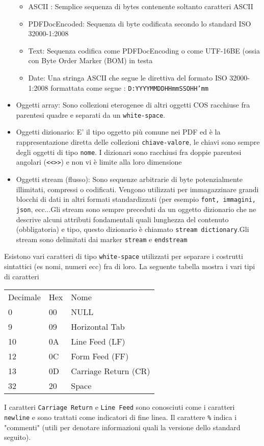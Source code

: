 \begin{itemize}
\begin{itemize}
		\item ASCII : Semplice sequenza di bytes contenente soltanto caratteri ASCII
		\item PDFDocEncoded: Sequenza di byte codificata secondo lo standard ISO 32000-1:2008 
		\item Text: Sequenza codifica come PDFDocEncoding o come UTF-16BE (ossia con Byte Order Marker (BOM) in testa
		\item Date: Una stringa ASCII che segue le direttiva del formato ISO 32000-1:2008 formattata come segue : \texttt{D:YYYYMMDDHHmmSSOHH’mm}
	\end{itemize}
	 \item Oggetti array: Sono collezioni eterogenee di altri oggetti COS racchiuse fra parentesi quadre e separati da un \texttt{white-space}.
	 \item Oggetti dizionario: E' il tipo oggetto più comune nei PDF ed è la rappresentazione diretta delle collezioni \texttt{chiave-valore}, le chiavi sono sempre degli oggetti di tipo \texttt{nome}. I dizionari sono racchiusi fra doppie parentesi angolari (\texttt{<<>>}) e non vi è limite alla loro dimensione
	 \item Oggetti stream (flusso): Sono sequenze arbitrarie di byte potenzialmente illimitati, compressi o codificati. Vengono utilizzati per immagazzinare grandi blocchi di dati in altri formati standardizzati (per esempio \texttt{font, immagini, json}, ecc...\newline Gli stream sono sempre preceduti da un oggetto dizionario che ne descrive alcuni attributi fondamentali quali lunghezza del contenuto (obbligatoria) e tipo, questo dizionario è chiamato \texttt{stream dictionary}.\newline Gli stream sono delimitati dai marker \texttt{stream} e \texttt{endstream}
	\end{itemize}
Esistono vari caratteri di tipo \texttt{white-space} utilizzati per separare i costrutti sintattici (es nomi, numeri ecc) fra di loro.
La seguente tabella mostra i vari tipi di caratteri
\newline
\begin{table}[h]
\center
\begin{tabular}{lll}
Decimale & Hex & Nome                 \\
0        & 00  & NULL                 \\
9        & 09  & Horizontal Tab       \\
10       & 0A  & Line Feed (LF)       \\
12       & 0C  & Form Feed (FF)       \\
13       & 0D  & Carriage Return (CR) \\
32       & 20  & Space               
\end{tabular}
\end{table}
\newline
I caratteri \texttt{Carriage Return} e \texttt{Line Feed} sono conosciuti come i caratteri \texttt{newline} e sono trattati come indicatori di fine linea. Il carattere \texttt{\%} indica i "commenti" (utili per denotare informazioni quali la versione dello standard seguito).
